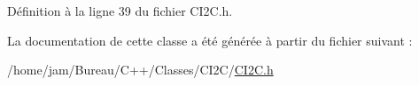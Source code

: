 Définition à la ligne 39 du fichier C\+I2\+C.\+h.



La documentation de cette classe a été générée à partir du fichier suivant \+:\begin{DoxyCompactItemize}
\item 
/home/jam/\+Bureau/\+C++/\+Classes/\+C\+I2\+C/\hyperlink{_c_i2_c_8h}{C\+I2\+C.\+h}\end{DoxyCompactItemize}
